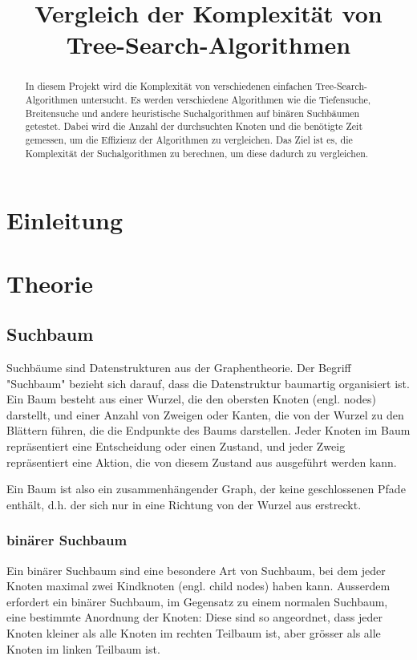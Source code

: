 \documentclass[a4paper,11pt]{article}
\title{Vergleich der Komplexität von \break Tree-Search-Algorithmen}
\author{}
\begin{document}
\maketitle
\thispagestyle{empty}
\pagebreak
{}
\begin{abstract}
In diesem Projekt wird die Komplexität von verschiedenen einfachen Tree-Search-Algorithmen untersucht. Es werden verschiedene Algorithmen wie die Tiefensuche, Breitensuche und andere heuristische Suchalgorithmen auf binären Suchbäumen getestet. Dabei wird die Anzahl der durchsuchten Knoten und die benötigte Zeit gemessen, um die Effizienz der Algorithmen zu vergleichen. Das Ziel ist es, die Komplexität der Suchalgorithmen zu berechnen, um diese dadurch zu vergleichen.
\end{abstract}
\pagebreak
\tableofcontents
\pagebreak


\section{Einleitung}
\cite{c2_algorithms}
\section{Theorie}
\subsection{Suchbaum}
Suchbäume sind Datenstrukturen aus der Graphentheorie. Der Begriff "Suchbaum" bezieht sich darauf, dass die Datenstruktur baumartig organisiert ist. Ein Baum besteht aus einer Wurzel, die den obersten Knoten (engl. nodes) darstellt, und einer Anzahl von Zweigen oder Kanten, die von der Wurzel zu den Blättern führen, die die Endpunkte des Baums darstellen. Jeder Knoten im Baum repräsentiert eine Entscheidung oder einen Zustand, und jeder Zweig repräsentiert eine Aktion, die von diesem Zustand aus ausgeführt werden kann.

Ein Baum ist also ein zusammenhängender Graph, der keine geschlossenen Pfade enthält\cite{graphs}, d.h. der sich nur in eine Richtung von der Wurzel aus erstreckt.

\subsubsection{binärer Suchbaum}
Ein binärer Suchbaum sind eine besondere Art von Suchbaum, bei dem jeder Knoten maximal zwei Kindknoten (engl. child nodes) haben kann. Ausserdem erfordert ein binärer Suchbaum, im Gegensatz zu einem normalen Suchbaum, eine bestimmte Anordnung der Knoten: Diese sind so angeordnet, dass jeder Knoten kleiner als alle Knoten im rechten Teilbaum ist, aber grösser als alle Knoten im linken Teilbaum ist.
\end{document}
